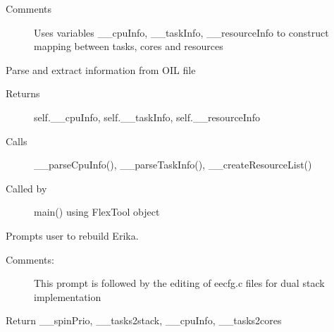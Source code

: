 \documentclass[letterpaper,10pt,english]{sphinxmanual}
\begin{document}
\begin{fulllineitems}
\begin{fulllineitems}
\begin{description}
\item[{Comments}] \leavevmode{[}{]}
Uses variables \_\_cpuInfo, \_\_taskInfo, \_\_resourceInfo to construct mapping between tasks, cores and resources

\end{description}

\end{fulllineitems}


\begin{fulllineitems}
\label{\detokenize{code:FlexTool.FlexTool.parseOilFile}}
Parse and extract information from OIL file
\begin{description}
\item[{Returns}] \leavevmode{[}{]}
self.\_\_cpuInfo, self.\_\_taskInfo, self.\_\_resourceInfo

\item[{Calls}] \leavevmode{[}{]}
\_\_parseCpuInfo(), \_\_parseTaskInfo(), \_\_createResourceList()

\item[{Called by}] \leavevmode{[}{]}
main() using FlexTool object

\end{description}

\end{fulllineitems}


\begin{fulllineitems}
\label{\detokenize{code:FlexTool.FlexTool.promptUser}}
Prompts user to rebuild Erika.
\begin{description}
\item[{Comments: }] \leavevmode
This prompt is followed by the editing of eecfg.c files for dual stack implementation

\end{description}

\end{fulllineitems}


\begin{fulllineitems}
\label{\detokenize{code:FlexTool.FlexTool.returnFlexSpinInfo}}
Return \_\_spinPrio, \_\_tasks2stack, \_\_cpuInfo, \_\_tasks2cores


\end{fulllineitems}
\end{fulllineitems}
\end{document}
